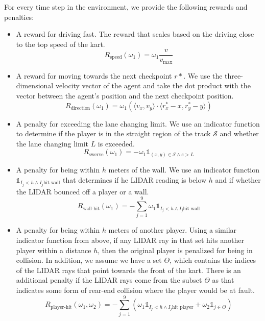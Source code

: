 For every time step in the environment, we provide the following rewards and penalties:
\begin{itemize}
    \item A reward for driving fast. The reward that scales based on the driving close to the top speed of the kart.
    \begin{equation*}
        R_{\text{speed}}(\omega_1) = \omega_1 \frac{v}{v_{\text{max}}}
    \end{equation*}
    \item A reward for moving towards the next checkpoint $r*$. We use the three-dimensional velocity vector of the agent and take the dot product with the vector between the agent's position and the next checkpoint position.
    \begin{equation*}
        R_{\text{direction}}(\omega_1) = \omega_1 (\langle v_x, v_y \rangle \cdot \langle r^*_x-x , r^*_y - y\rangle)
    \end{equation*}
    \item A penalty for exceeding the lane changing limit. We use an indicator function to determine if the player is in the straight region of the track $\mathcal{S}$ and whether the lane changing limit $L$ is exceeded.
    \begin{equation*}
        R_{\text{swerve}}(\omega_1) = -\omega_1 \mathds{1}_{(x,y) \in \mathcal{S} \wedge e > L}
    \end{equation*}
    \item A penalty for being within $h$ meters of the wall. We use an indicator function $\mathds{1}_{I_j < h \wedge I_j \text{hit wall}}$ that determines if he LIDAR reading is below $h$ and if whether the LIDAR bounced off a player or a wall.
    \begin{equation*}
        R_{\text{wall-hit}}(\omega_1) = -\sum_{j=1}^9 \omega_1 \mathds{1}_{I_j < h \wedge I_j \text{hit wall}}
    \end{equation*}
    \item A penalty for being within $h$ meters of another player. Using a similar indicator function from above, if any LIDAR ray in that set hits another player within a distance $h$, then the original player is penalized for being in collision. In addition, we assume we have a set $\Theta$, which contains the indices of the LIDAR rays that point towards the front of the kart. There is an additional penalty if the LIDAR rays come from the subset $\Theta$ as that indicates some form of rear-end collision where the player would be at fault. 
    \begin{equation*}
        R_{\text{player-hit}}(\omega_1, \omega_2) = -\sum_{j=1}^9 (\omega_1 \mathds{1}_{I_j < h \wedge I_j \text{hit player}} + \omega_2 \mathds{1}_{j \in \Theta})
    \end{equation*}
\end{itemize}

